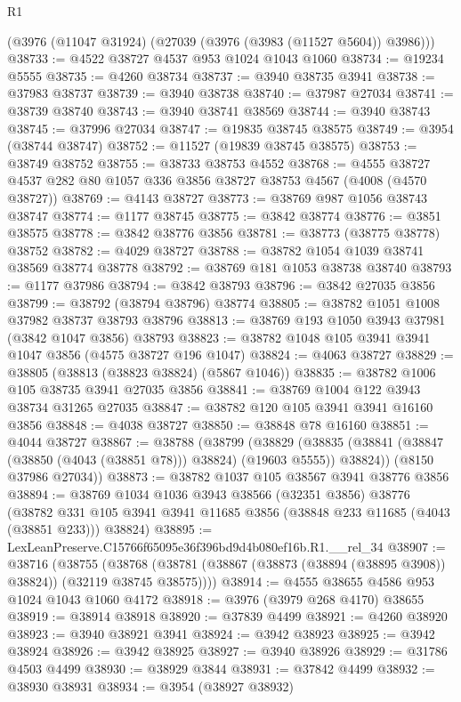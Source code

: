 \begin{lexlean}{R1}
\begin{coremodule}
    (@3976 (@11047 @31924) (@27039 (@3976 (@3983 (@11527 @5604)) @3986)))
@38733 := @4522 @38727 @4537 @953 @1024 @1043 @1060
@38734 := @19234 @5555
@38735 := @4260 @38734
@38737 := @3940 @38735 @3941
@38738 := @37983 @38737
@38739 := @3940 @38738
@38740 := @37987 @27034
@38741 := @38739 @38740
@38743 := @3940 @38741 @38569
@38744 := @3940 @38743
@38745 := @37996 @27034
@38747 := @19835 @38745 @38575
@38749 := @3954 (@38744 @38747)
@38752 := @11527 (@19839 @38745 @38575)
@38753 := @38749 @38752
@38755 := @38733 @38753 @4552
@38768 := @4555 @38727 @4537 @282 @80 @1057 @336 @3856 @38727 @38753 @4567 (@4008 (@4570 @38727))
@38769 := @4143 @38727
@38773 := @38769 @987 @1056 @38743 @38747
@38774 := @1177 @38745
@38775 := @3842 @38774
@38776 := @3851 @38575
@38778 := @3842 @38776 @3856
@38781 := @38773 (@38775 @38778) @38752
@38782 := @4029 @38727
@38788 := @38782 @1054 @1039 @38741 @38569 @38774 @38778
@38792 := @38769 @181 @1053 @38738 @38740
@38793 := @1177 @37986
@38794 := @3842 @38793
@38796 := @3842 @27035 @3856
@38799 := @38792 (@38794 @38796) @38774
@38805 := @38782 @1051 @1008 @37982 @38737 @38793 @38796
@38813 := @38769 @193 @1050 @3943 @37981 (@3842 @1047 @3856) @38793
@38823 := @38782 @1048 @105 @3941 @3941 @1047 @3856 (@4575 @38727 @196 @1047)
@38824 := @4063 @38727
@38829 := @38805 (@38813 (@38823 @38824) (@5867 @1046))
@38835 := @38782 @1006 @105 @38735 @3941 @27035 @3856
@38841 := @38769 @1004 @122 @3943 @38734 @31265 @27035
@38847 := @38782 @120 @105 @3941 @3941 @16160 @3856
@38848 := @4038 @38727
@38850 := @38848 @78 @16160
@38851 := @4044 @38727
@38867 := @38788
    (@38799
      (@38829 (@38835 (@38841 (@38847 (@38850 (@4043 (@38851 @78))) @38824) (@19603 @5555)) @38824))
      (@8150 @37986 @27034))
@38873 := @38782 @1037 @105 @38567 @3941 @38776 @3856
@38894 := @38769
    @1034
    @1036
    @3943
    @38566
    (@32351 @3856)
    @38776
    (@38782 @331 @105 @3941 @3941 @11685 @3856 (@38848 @233 @11685 (@4043 (@38851 @233))) @38824)
@38895 := LexLeanPreserve.C15766f65095e36f396bd9d4b080ef16b.R1.__rel_34
@38907 := @38716
    (@38755
      (@38768 (@38781 (@38867 (@38873 (@38894 (@38895 @3908)) @38824)) (@32119 @38745 @38575))))
@38914 := @4555 @38655 @4586 @953 @1024 @1043 @1060 @4172
@38918 := @3976 (@3979 @268 @4170) @38655
@38919 := @38914 @38918
@38920 := @37839 @4499
@38921 := @4260 @38920
@38923 := @3940 @38921 @3941
@38924 := @3942 @38923
@38925 := @3942 @38924
@38926 := @3942 @38925
@38927 := @3940 @38926
@38929 := @31786 @4503 @4499
@38930 := @38929 @3844
@38931 := @37842 @4499
@38932 := @38930 @38931
@38934 := @3954 (@38927 @38932)

\end{coremodule}
\end{lexlean}
